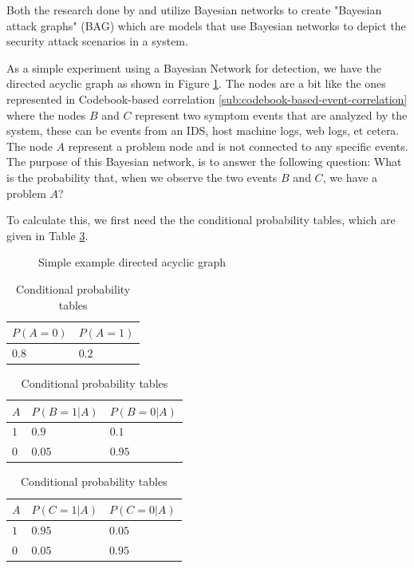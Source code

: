 Both the research done by \textcite{Kavousi_2014} and \textcite{Qin_2004} utilize Bayesian networks to create "Bayesian attack graphs" (BAG) which are models that use Bayesian networks to depict the security attack scenarios in a system.

As a simple experiment using a Bayesian Network for detection, we have the directed acyclic graph as shown in Figure \ref{fig:simple-directed-acyclic-graph}. The nodes are a bit like the ones represented in Codebook-based correlation \ref{sub:codebook-based-event-correlation} where the nodes $B$ and $C$ represent two symptom events that are analyzed by the system, these can be events from an IDS, host machine logs, web logs, et cetera. The node $A$ represent a problem node and is not connected to any specific events. The purpose of this Bayesian network, is to answer the following question: What is the probability that, when we observe the two events $B$ and $C$, we have a problem $A$?

To calculate this, we first need the the conditional probability tables, which are given in Table \ref{tab:probabability-tables}.

\begin{figure}[ht]
\centering
{}
\caption{Simple example directed acyclic graph}
\label{fig:simple-directed-acyclic-graph}
\end{figure}

\begin{table}[ht]
\centering
\begin{tabular}{|l|l|}
\hline
$P(A = 0)$ & $P(A = 1)$ \\ \hline
$0.8$ & $0.2$ \\ \hline
\end{tabular}
\begin{tabular}{|l|l|l|}
\hline
$A$ & $P(B = 1|A)$ & $P(B = 0|A)$ \\ \hline
$1$ & $0.9$ & $0.1$ \\ \hline
$0$ & $0.05$ & $0.95$ \\ \hline
\end{tabular}
\centering
\begin{tabular}{|l|l|l|}
\hline
$A$ & $P(C = 1|A)$ & $P(C = 0|A)$ \\ \hline
$1$ & $0.95$ & $0.05$ \\ \hline
$0$ & $0.05$ & $0.95$ \\ \hline
\end{tabular}
\caption{Conditional probability tables}
\label{tab:probabability-tables}
\end{table}

